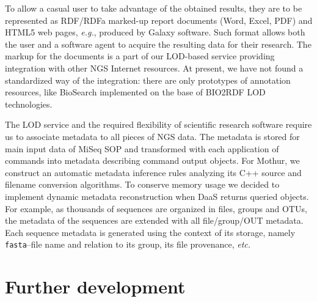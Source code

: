 \documentclass[a4paper]{jpconf}
\begin{document}
To allow a casual user to take advantage of the obtained results, they are to be represented as RDF/RDFa marked-up report documents (Word, Excel, PDF) and HTML5 web pages, \emph{e.g.}, produced by Galaxy software.  Such format allows both the user and a software agent to acquire the resulting data for their research.  The markup for the documents is a part of our LOD-based service providing integration with other NGS Internet resources.  At present, we have not found a standardized way of the integration: there are only prototypes of annotation resources, like BioSearch \cite{biosearch} implemented on the base of BIO2RDF LOD technologies.

The LOD service and the required flexibility of scientific research software require us to associate metadata to all pieces of NGS data.  The metadata is stored for main input data of MiSeq SOP and transformed with each application of commands into metadata describing command output objects.  For Mothur, we construct an automatic metadata inference rules analyzing its C++ source and filename conversion algorithms.  To conserve memory usage we decided to implement dynamic metadata reconstruction when DaaS returns queried objects.  For example, as thousands of sequences are organized in files, groups and OTUs, the metadata of the sequences are extended with all file/group/OUT metadata. Each sequence metadata is generated using the context of its storage, namely \verb|fasta|--file name and relation to its group, its file provenance, \emph{etc.}


\section{Further development}
\end{document}
